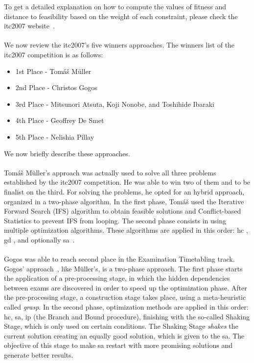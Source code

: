 To get a detailed explanation on how to compute the values of fitness and distance to feasibility based on the weight of each constraint, please check the \gls{itc2007} website~\cite{McCollum2007}.\\
\\
We now review the \gls{itc2007}'s five winners approaches. The winners list of the \gls{itc2007} competition is as follows:
\begin{itemize}
	\item 1st Place - Tom\'{a}\v{s} M\"{u}ller
	\item 2nd Place - Christos Gogos
	\item 3rd Place - Mitsunori Atsuta, Koji Nonobe, and Toshihide Ibaraki
	\item 4th Place - Geoffrey De Smet
	\item 5th Place - Nelishia Pillay
\end{itemize}
We now briefly describe these approaches.\\
\\
Tom\'{a}\v{s} M\"{u}ller's approach \cite{Mueller2009} was actually used to solve all three problems established by the \gls{itc2007} competition. He was able to win two of them and to be finalist on the third. For solving the problems, he opted for an hybrid approach, organized in a two-phase algorithm. In the first phase, Tom\'{a}\v{s} used the Iterative Forward Search (IFS) algorithm \cite{Mueller2005} to obtain feasible solutions and Conflict-based Statistics \cite{Mueller2004} to prevent IFS from looping. The second phase consists in using multiple optimization algorithms. These algorithms are applied in this order: \gls{hc} \cite{Russell2010}, \gls{gd} \cite{Dueck1993}, and optionally \gls{sa}~\cite{Kirkpatrick1983}.\\
\\
Gogos was able to reach second place in the Examination Timetabling track. Gogos' approach~\cite{Gogos2012}, like M\"{u}ller's, is a two-phase approach. The first phase starts the application of a pre-processing stage, in which the hidden dependencies between exams are discovered in order to speed up the optimization phase. After the pre-processing stage, a construction stage takes place, using a meta-heuristic called \textit{\gls{grasp}}. In the second phase, optimization methods are applied in this order: \gls{hc}, \gls{sa}, \gls{ip} (the Branch and Bound procedure), finishing with the so-called Shaking Stage, which is only used on certain conditions. The Shaking Stage \textit{shakes} the current solution creating an equally good solution, which is given to the \gls{sa}. The objective of this stage to make \gls{sa} restart with more promising solutions and generate better results.\\
